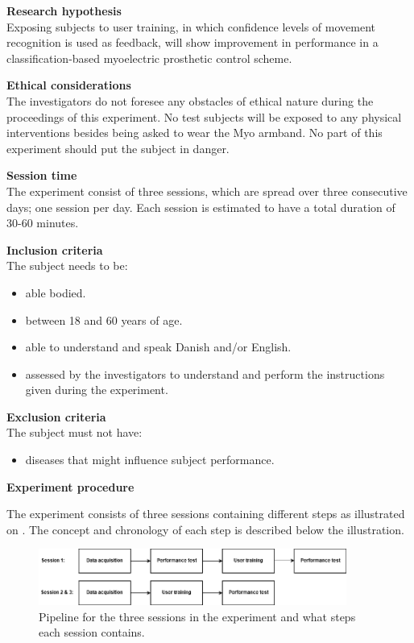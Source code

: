 \textbf{Research hypothesis} \\
Exposing subjects to user training, in which confidence levels of movement recognition is used as feedback, will show improvement in performance in a classification-based myoelectric prosthetic control scheme.%

\textbf{Ethical considerations}  \\
The investigators do not foresee any obstacles of ethical nature during the proceedings of this experiment. No test subjects will be exposed to any physical interventions besides being asked to wear the Myo armband. No part of this experiment should put the subject in danger. 

\textbf{Session time} \\
The experiment consist of three sessions, which are spread over three consecutive days; one session per day. Each session is estimated to have a total duration of 30-60 minutes. 

\textbf{Inclusion criteria} \\
The subject needs to be:
\begin{itemize}
	\item able bodied.
	\item between 18 and 60 years of age.
	\item able to understand and speak Danish and/or English.
	\item assessed by the investigators to understand and perform the instructions given during the experiment. 
\end{itemize}


\textbf{Exclusion criteria} \\
The subject must not have:
\begin{itemize}
	\item diseases that might influence subject performance. 
\end{itemize}


\textbf{\Large{Experiment procedure}}

The experiment consists of three sessions containing different steps as illustrated on . The concept and chronology of each step is described below the illustration.


\begin{figure}[H]                                         
	\includegraphics[width=0.9\textwidth]{figures/pMethods/experiment_protocol_pipeline}  
	\caption{Pipeline for the three sessions in the experiment and what steps each session contains.}
	\label{fig:experiment_protocol_pipeline} 
\end{figure}  


